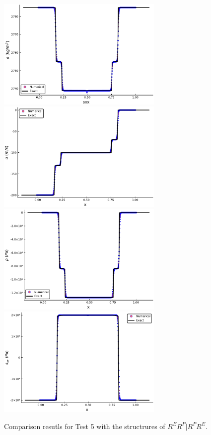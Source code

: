 \documentclass{article}
\numberwithin{equation}{section}
\numberwithin{table}{section}
\begin{document}
\begin{figure}
  \centering
 \includegraphics[width= 8cm] {case20rho.pdf}
  \includegraphics[width= 8cm] {case20u.pdf}
  \includegraphics[width= 8cm] {case20p.pdf}
  \includegraphics[width= 8cm] {case20sxx.pdf}
    \caption{Comparison resutls for Test 5 with the structrures of $R^ER^P|R^PR^E$.  }
  \label{fig:case20}
\end{figure}
\end{document}
